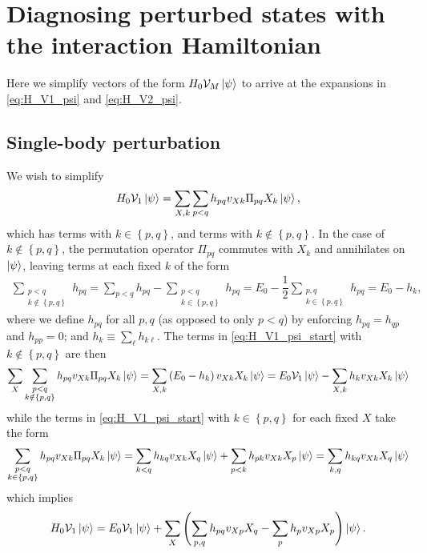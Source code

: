 \documentclass[nofootinbib,notitlepage,11pt]{revtex4-2}
\newcommand{\f}[2]{\dfrac{#1}{#2}} %
\newcommand{\p}[1]{\left(#1\right)} %
\renewcommand{\set}[1]{\left\{#1\right\}} %
\newcommand{\1}{\mathds{1}}
\newcommand{\V}{\mathcal{V}}
\begin{document}
\section{Diagnosing perturbed states with the interaction Hamiltonian}

Here we simplify vectors of the form $H_0\V_M\ket\psi$ to arrive at
the expansions in \eqref{eq:H_V1_psi} and \eqref{eq:H_V2_psi}.

\subsection{Single-body perturbation}
\label{sec:H_V1_psi}

We wish to simplify
\begin{align}
  H_0 \V_1 \ket\psi
  = \sum_{X,k} \sum_{p<q} h_{pq} v_{Xk} \Pi_{pq} X_k \ket\psi,
  \label{eq:H_V1_psi_start}
\end{align}
which has terms with $k\in\set{p,q}$, and terms with
$k\notin\set{p,q}$.  In the case of $k\notin\set{p,q}$, the
permutation operator $\Pi_{pq}$ commutes with $X_k$ and annihilates on
$\ket\psi$, leaving terms at each fixed $k$ of the form
\begin{align}
  \sum_{\substack{p<q\\k\notin\set{p,q}}} h_{pq}
  = \sum_{p<q} h_{pq} - \sum_{\substack{p<q\\k\in\set{p,q}}} h_{pq}
  = E_0 - \f12 \sum_{\substack{p,q\\k\in\set{p,q}}} h_{pq}
  = E_0 - h_k,
\end{align}
where we define $h_{pq}$ for all $p,q$ (as opposed to only $p<q$) by
enforcing $h_{pq}=h_{qp}$ and $h_{pp}=0$; and
$h_k \equiv \sum_\ell h_{k\ell}$.  The terms in
\eqref{eq:H_V1_psi_start} with $k\notin\set{p,q}$ are then
\begin{align}
  \sum_X \sum_{\substack{p<q\\k\notin\set{p,q}}}
  h_{pq} v_{Xk} \Pi_{pq} X_k \ket\psi
  = \sum_{X,k} \p{E_0 - h_k} v_{Xk} X_k \ket\psi
  = E_0 \V_1 \ket\psi - \sum_{X,k} h_k v_{Xk} X_k \ket\psi
\end{align}
while the terms in \eqref{eq:H_V1_psi_start} with $k\in\set{p,q}$ for
each fixed $X$ take the form
\begin{align}
  \sum_{\substack{p<q\\k\in\set{p,q}}}
  h_{pq} v_{Xk} \Pi_{pq} X_k \ket\psi
  = \sum_{k<q} h_{kq} v_{Xk} X_q \ket\psi
  + \sum_{p<k} h_{pk} v_{Xk} X_p \ket\psi
  = \sum_{k,q} h_{kq} v_{Xk} X_q \ket\psi
\end{align}
which implies
\begin{align}
  H_0 \V_1 \ket\psi
  = E_0 \V_1 \ket\psi
  + \sum_X \p{\sum_{p,q} h_{pq} v_{Xp} X_q - \sum_p h_p v_{Xp} X_p}
  \ket\psi.
\end{align}
\end{document}
